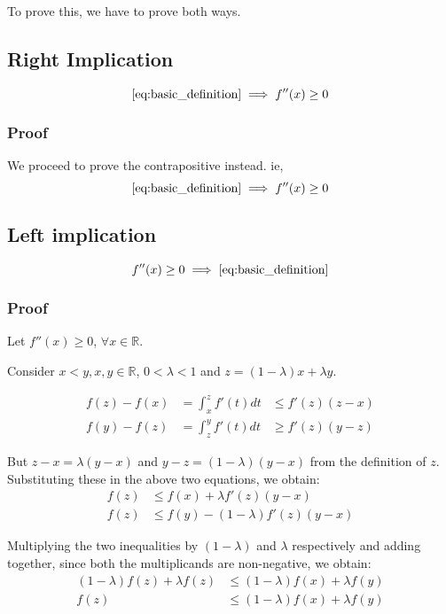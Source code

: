 \documentclass{article}
\begin{document}
	To prove this, we have to prove both ways.
	\subsection{Right Implication}
	\begin{equation*}
		\eqref{eq:basic_definition} \implies f''(x) \geq 0 
	\end{equation*}
	
	\subsubsection{Proof}
	We proceed to prove the contrapositive instead. ie,
	\begin{equation*}
		\eqref{eq:basic_definition} \implies f''(x) \geq 0 
	\end{equation*}
	
	\subsection{Left implication}	
	\begin{equation*}
		f''(x) \geq 0  \implies \eqref{eq:basic_definition}
	\end{equation*}
	\subsubsection{Proof}
	Let $f''(x) \geq 0$, $\forall x \in \mathbb{R}$. 
	
	Consider $x < y, x, y \in \mathbb{R}$, $0 < \lambda < 1$ and $z = (1-\lambda)x + \lambda y$.
	
	\begin{align*}
		f(z) - f(x) &= \int_{x}^{z}{f'(t)dt} &\leq f'(z)(z - x)\\	
		f(y) - f(z) &= \int_{z}^{y}{f'(t)dt} &\geq f'(z)(y - z)
	\end{align*}
	
	But $z - x = \lambda (y-x)$ and $y-z = (1-\lambda)(y - x)$ from the definition of $z$. Substituting these in the above two equations, we obtain:
\begin{align*}
	f(z) &\leq f(x) + \lambda f'(z) (y-x)\\
	f(z) &\leq f(y) - (1-\lambda) f'(z) (y-x)
\end{align*}

Multiplying the two inequalities by $(1-\lambda)$ and $\lambda$ respectively and adding together, since both the multiplicands are non-negative, we obtain:
   \begin{align*}
   		(1-\lambda)f(z) + \lambda f(z) &\leq (1-\lambda)f(x) + \lambda f(y) \\
   		f(z) &\leq (1-\lambda)f(x) + \lambda f(y) 
   \end{align*}
   
\end{document}
